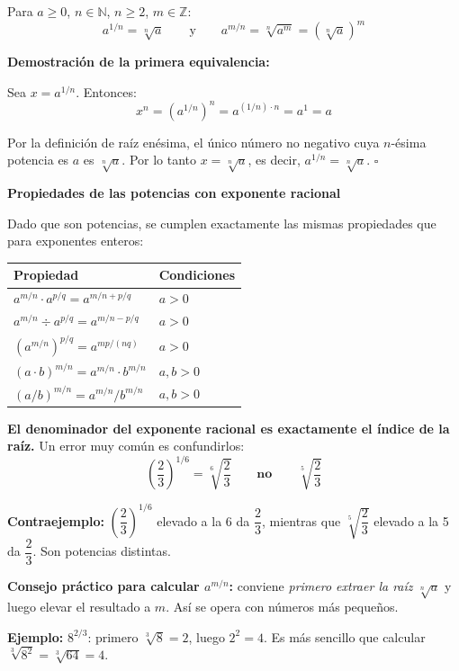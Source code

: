 \documentclass[11pt, letterpaper]{article}
\begin{document}
\begin{tcolorbox}[importantbox, title={Equivalencia — raíz enésima y potencia de exponente racional}]
Para $a \geq 0$, $n \in \mathbb{N}$, $n \geq 2$, $m \in \mathbb{Z}$:
$$\boxed{a^{1/n} = \sqrt[n]{a}} \qquad\text{y}\qquad \boxed{a^{m/n} = \sqrt[n]{a^m} = \left(\sqrt[n]{a}\right)^m}$$

\textbf{Demostración de la primera equivalencia:}

Sea $x = a^{1/n}$. Entonces:
$$x^n = \left(a^{1/n}\right)^n = a^{(1/n)\cdot n} = a^1 = a$$

Por la definición de raíz enésima, el único número no negativo cuya $n$-ésima potencia es $a$ es $\sqrt[n]{a}$. Por lo tanto $x = \sqrt[n]{a}$, es decir, $a^{1/n} = \sqrt[n]{a}$. $\square$

\medskip
\textbf{Propiedades de las potencias con exponente racional}

Dado que son potencias, se cumplen exactamente las mismas propiedades que para exponentes enteros:

\medskip
\begin{center}
\renewcommand{\arraystretch}{1.5}
\begin{tabular}{l|l}
\toprule
\textbf{Propiedad} & \textbf{Condiciones}\\
\midrule
$a^{m/n}\cdot a^{p/q} = a^{m/n+p/q}$ & $a > 0$\\
$a^{m/n} \div a^{p/q} = a^{m/n-p/q}$ & $a > 0$\\
$\left(a^{m/n}\right)^{p/q} = a^{mp/(nq)}$ & $a > 0$\\
$(a \cdot b)^{m/n} = a^{m/n}\cdot b^{m/n}$ & $a,b > 0$\\
$(a/b)^{m/n} = a^{m/n}/b^{m/n}$ & $a,b > 0$\\
\bottomrule
\end{tabular}
\end{center}
\end{tcolorbox}

\begin{tcolorbox}[warningbox, title={Error frecuente — leer mal el exponente racional}]
\textbf{El denominador del exponente racional es exactamente el índice de la raíz.} Un error muy común es confundirlos:
$$\left(\frac{2}{3}\right)^{1/6} = \sqrt[6]{\frac{2}{3}} \qquad \textbf{no} \qquad \sqrt[5]{\frac{2}{3}}$$

\textbf{Contraejemplo:} $\left(\dfrac{2}{3}\right)^{1/6}$ elevado a la 6 da $\dfrac{2}{3}$, mientras que $\sqrt[5]{\dfrac{2}{3}}$ elevado a la 5 da $\dfrac{2}{3}$. Son potencias distintas.

\medskip
\textbf{Consejo práctico para calcular $a^{m/n}$:} conviene \emph{primero extraer la raíz} $\sqrt[n]{a}$ y luego elevar el resultado a $m$. Así se opera con números más pequeños.

\medskip
\textbf{Ejemplo:} $8^{2/3}$: primero $\sqrt[3]{8} = 2$, luego $2^2 = 4$. Es más sencillo que calcular $\sqrt[3]{8^2} = \sqrt[3]{64} = 4$.
\end{tcolorbox}
\end{document}
